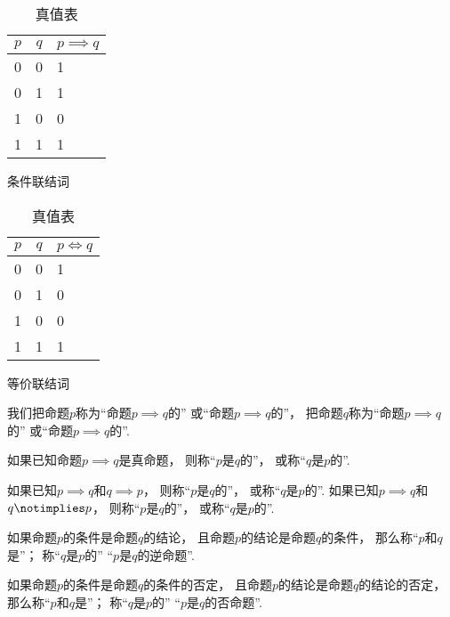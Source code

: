 \begin{table}[htb]
	\begin{subtable}[ht]{0.45\textwidth}
		\centering
		\begin{tabular}{|*{2}{c|}p{2cm}|}
			\hline
			\(p\) & \(q\) & \(p \implies q\) \\ \hline
			0 & 0 & 1 \\ \hline
			0 & 1 & 1 \\ \hline
			1 & 0 & 0 \\ \hline
			1 & 1 & 1 \\ \hline
		\end{tabular}
		\caption{条件联结词}
	\end{subtable}
	\begin{subtable}[ht]{0.45\textwidth}
		\centering
		\begin{tabular}{|*{2}{c|}p{2cm}|}
			\hline
			\(p\) & \(q\) & \(p \iff q\) \\ \hline
			0 & 0 & 1 \\ \hline
			0 & 1 & 0 \\ \hline
			1 & 0 & 0 \\ \hline
			1 & 1 & 1 \\ \hline
		\end{tabular}
	\caption{等价联结词}
	\end{subtable}
	\caption{真值表}
\end{table}

我们把命题\(p\)称为“命题\(p \implies q\)的”
或“命题\(p \implies q\)的”，
把命题\(q\)称为“命题\(p \implies q\)的”
或“命题\(p \implies q\)的”.

如果已知命题\(p \implies q\)是真命题，
则称“\(p\)是\(q\)的”，
或称“\(q\)是\(p\)的”.

如果已知\(p \implies q\)和\(q \implies p\)，
则称“\(p\)是\(q\)的”，
或称“\(q\)是\(p\)的”.
如果已知\(p \implies q\)和\(q \notimplies p\)，
则称“\(p\)是\(q\)的”，
或称“\(q\)是\(p\)的”.

如果命题\(p\)的条件是命题\(q\)的结论，
且命题\(p\)的结论是命题\(q\)的条件，
那么称“\(p\)和\(q\)是”；
称“\(q\)是\(p\)的”
“\(p\)是\(q\)的逆命题”.

如果命题\(p\)的条件是命题\(q\)的条件的否定，
且命题\(p\)的结论是命题\(q\)的结论的否定，
那么称“\(p\)和\(q\)是”；
称“\(q\)是\(p\)的”
“\(p\)是\(q\)的否命题”.

